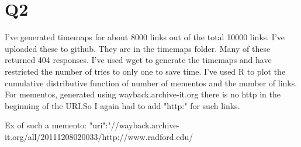 \documentclass[12pt]{article} %
\begin{document}




\section{Q2}
I've generated timemaps for about 8000 links out of the total 10000 links. I've uploaded these to github. They are in the timemaps folder. Many of these returned 404 responses. I've used wget to generate the timemaps and have restricted the number of tries to only one to save time.
I've used R to plot the cumulative distributive function of number of mementos and the number of links.
For mementos, generated using wayback.archive-it.org there is no http in the  beginning of the URI.So I again had to add "http:" for such links. 

Ex of such a memento:
"uri":"//wayback.archive-it.org/all/20111208020033/http://www.radford.edu/
\end{document}
